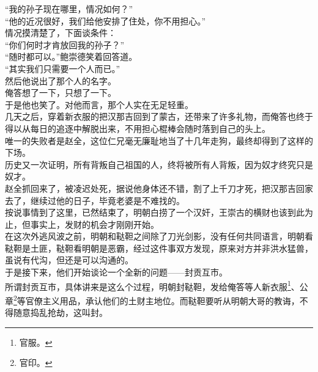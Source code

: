 \begin{multicols}{\theparacolNo}
“我的孙子现在哪里，情况如何？”\\

“他的近况很好，我们给他安排了住处，你不用担心。”\\

情况摸清楚了，下面谈条件：\\

“你们何时才肯放回我的孙子？”\\

“随时都可以。”鲍崇德笑着回答道。\\

“其实我们只需要一个人而已。”\\

然后他说出了那个人的名字。\\

俺答想了一下，只想了一下。\\

于是他也笑了。对他而言，那个人实在无足轻重。\\

几天之后，穿着新衣服的把汉那吉回到了蒙古，还带来了许多礼物，而俺答也终于得以从每日的追逐中解脱出来，不用担心棍棒会随时落到自己的头上。\\

唯一的失败者是赵全，这位仁兄毫无廉耻地当了十几年走狗，最终却得到了这样的下场。\\

历史又一次证明，所有背叛自己祖国的人，终将被所有人背叛，因为奴才终究只是奴才。\\

赵全抓回来了，被凌迟处死，据说他身体还不错，割了上千刀才死，把汉那吉回家去了，继续过他的日子，毕竟老婆是不难找的。\\

按说事情到了这里，已然结束了，明朝白捞了一个汉奸，王崇古的横财也该到此为止，但事实上，发财的机会才刚刚开始。\\

在这次外逃风波之前，明朝和鞑靼之间除了刀光剑影，没有任何共同语言，明朝看鞑靼是土匪，鞑靼看明朝是恶霸，经过这件事双方发现，原来对方并非洪水猛兽，虽说有代沟，但还是可以沟通的。\\

于是接下来，他们开始谈论一个全新的问题——封贡互市。\\

所谓封贡互市，具体讲来是这么个过程，明朝封鞑靼，发给俺答等人新衣服\footnote{官服。}、公章\footnote{官印。}等官僚主义用品，承认他们的土财主地位。而鞑靼要听从明朝大哥的教诲，不得随意捣乱抢劫，这叫封。\\


\end{multicols}
